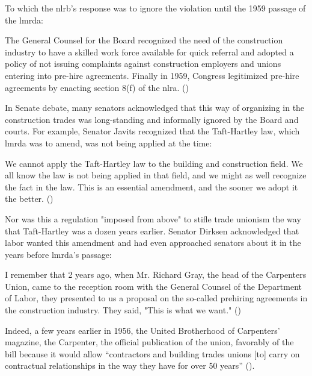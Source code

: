 \documentclass[12pt]{article}
\renewenvironment{quote}
  {\list{}{\leftmargin=\parindent\rightmargin=0pt}%
   \item\relax}
  {\endlist}
\begin{document}
To which the \acrshort{nlrb}’s response was to ignore the violation until the 1959 passage of the \acrshort{lmrda}:

\begin{quote}
The General Counsel for the Board recognized the need of the construction industry to have a skilled work force available for quick referral and adopted a policy of not issuing complaints against construction employers and unions entering into pre-hire agreements. Finally in 1959, Congress legitimized pre-hire agreements by enacting section 8(f) of the \acrshort{nlra}. (\cite[1017]{murphyPreHireAgreementsSection1982})
\end{quote}

In Senate debate, many senators acknowledged that this way of organizing in the construction trades was long-standing and informally ignored by the Board and courts. For example, Senator Javits recognized that the Taft-Hartley law, which \acrshort{lmrda} was to amend, was not being applied at the time:

\begin{quote}
We cannot apply the Taft-Hartley law to the building and construction field. We all know the law is not being applied in that field, and we might as well recognize the fact in the law. This is an essential amendment, and the sooner we adopt it the better. (\cite[6395]{105CongressionalRecord1959})
\end{quote}

Nor was this a regulation "imposed from above" to stifle trade unionism the way that Taft-Hartley was a dozen years earlier. Senator Dirksen acknowledged that labor wanted this amendment and had even approached senators about it in the years before \acrshort{lmrda}’s passage:

\begin{quote}
I remember that 2 years ago, when Mr. Richard Gray, the head of the Carpenters Union, came to the reception room with the General Counsel of the Department of Labor, they presented to us a proposal on the so-called prehiring agreements in the construction industry. They said, "This is what we want." (\cite[6414]{105CongressionalRecord1959})
\end{quote}

\noindent
Indeed, a few years earlier in 1956, the United Brotherhood of Carpenters’ magazine, the Carpenter, the official publication of the union, favorably of the bill because it would allow “contractors and building trades unions [to] carry on contractual relationships in the way they have for over 50 years” (\cite[7--8]{ubcActionTalksSay1956}).
\end{document}
